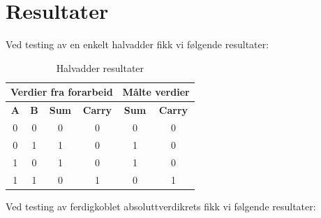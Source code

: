 \section{Resultater}
Ved testing av en enkelt halvadder fikk vi følgende resultater:

\begin{table}[!htb]
    \centering
    \caption{Halvadder resultater}
    \begin{tabular}{|c|c|c|c|c|c|}
        \hline
        \multicolumn{4}{|c|}{\textbf{Verdier fra forarbeid}} & \multicolumn{2}{c|}{\textbf{Målte verdier}} \\ \hline
        \textbf{A}    & \textbf{B} & \textbf{Sum}  & \textbf{Carry}  & \textbf{Sum}  & \textbf{Carry}\\ \hline
        0             & 0 & 0 & 0 &  0  & 0 \\ \hline
        0             & 1 & 1 & 0 &  1  & 0 \\ \hline
        1             & 0 & 1 & 0 &  1  & 0 \\ \hline
        1             & 1 & 0 & 1 &  0  & 1 \\ \hline
    \end{tabular}
\end{table}

Ved testing av ferdigkoblet absoluttverdikrets fikk vi følgende resultater:

